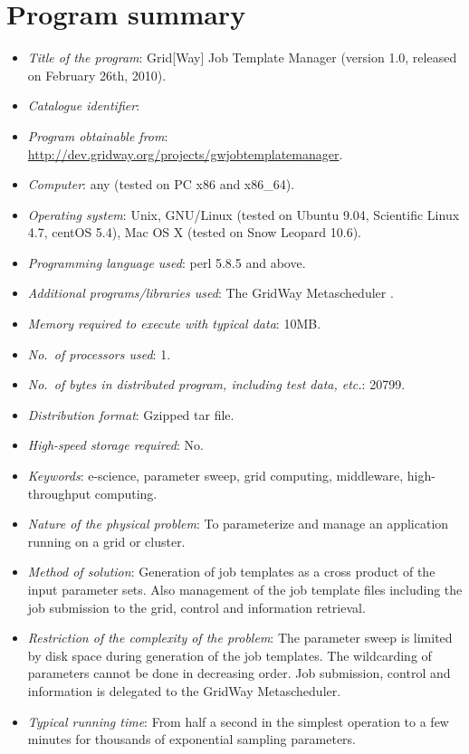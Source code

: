 \documentclass[12pt,a4paper]{article}
\def\linux{{\sc Linux}}
\begin{document}
\section{Program summary}
\begin{itemize}
\item {\em Title of the program}: Grid[Way] Job Template Manager (version 1.0, released on February 26th, 2010).
\item {\em Catalogue identifier}:
\item {\em Program obtainable from}:\\ \url{http://dev.gridway.org/projects/gwjobtemplatemanager}.
\item {\em Computer}: any (tested on PC x86 and x86\_64).
\item {\em Operating system}: Unix, GNU/\linux{} (tested on Ubuntu 9.04, Scientific Linux 4.7, centOS 5.4), Mac OS X (tested on Snow Leopard 10.6).
\item {\em Programming language used}: perl 5.8.5 and above.
\item {\em Additional programs/libraries used}: The GridWay Metascheduler \cite{gridway}.
\item {\em Memory required to execute with typical data}: 10MB.
\item {\em No.~of processors used}: 1.
\item {\em No.~of bytes in distributed program, including test data, etc.}: 20799.
\item {\em Distribution format}: Gzipped tar file.
\item {\em High-speed storage required}: No.
\item {\em Keywords}: e-science, parameter sweep, grid computing, middleware, high-throughput computing.
\item {\em Nature of the physical problem}: To parameterize and manage an application running on a grid or cluster.
\item {\em Method of solution}: Generation of job templates as a cross product of the input parameter sets. Also management of the job template files including the job submission to the grid, control and information retrieval.
\item {\em Restriction of the complexity of the problem}: The parameter sweep is limited by disk space during generation of the job templates. The wildcarding of parameters cannot be done in decreasing order. Job submission, control and information is delegated to the GridWay Metascheduler.
\item {\em Typical running time}: From half a second in the simplest operation to a few minutes for thousands of exponential sampling parameters.
\end{itemize}
\end{document}
